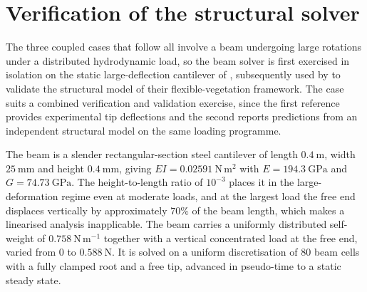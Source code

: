 \section{Verification of the structural solver}
\label{sec:cantilever}

\noindent
The three coupled cases that follow all involve a beam undergoing large rotations under a distributed hydrodynamic load, so the beam solver is first exercised in isolation on the static large-deflection cantilever of \citet{belendez_numerical_2003}, subsequently used by \citet{chen_eulerianlagrangian_2019} to validate the structural model of their flexible-vegetation framework. The case suits a combined verification and validation exercise, since the first reference provides experimental tip deflections and the second reports predictions from an independent structural model on the same loading programme.

\noindent
The beam is a slender rectangular-section steel cantilever of length $0.4~\mathrm{m}$, width $25~\mathrm{mm}$ and height $0.4~\mathrm{mm}$, giving $EI = 0.02591~\mathrm{N\,m^2}$ with $E = 194.3~\mathrm{GPa}$ and $G = 74.73~\mathrm{GPa}$. The height-to-length ratio of $10^{-3}$ places it in the large-deformation regime even at moderate loads, and at the largest load the free end displaces vertically by approximately $70\%$ of the beam length, which makes a linearised analysis inapplicable. The beam carries a uniformly distributed self-weight of $0.758~\mathrm{N\,m^{-1}}$ together with a vertical concentrated load at the free end, varied from $0$ to $0.588~\mathrm{N}$. It is solved on a uniform discretisation of $80$ beam cells with a fully clamped root and a free tip, advanced in pseudo-time to a static steady state.

